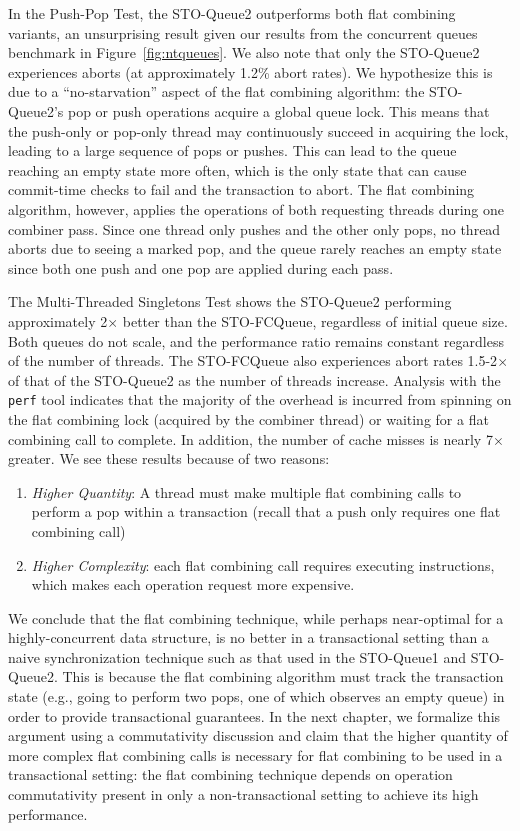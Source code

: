 In the Push-Pop Test, the STO-Queue2 outperforms both flat combining variants, an unsurprising result given our results from the concurrent queues benchmark in Figure~\ref{fig:ntqueues}. We also note that only the STO-Queue2 experiences aborts (at approximately 1.2\% abort rates). We hypothesize this is due to a ``no-starvation'' aspect of the flat combining algorithm: the STO-Queue2's pop or push operations acquire a global queue lock. This means that the push-only or pop-only thread may continuously succeed in acquiring the lock, leading to a large sequence of pops or pushes. This can lead to the queue reaching an empty state more often, which is the only state that can cause commit-time checks to fail and the transaction to abort. The flat combining algorithm, however, applies the operations of both requesting threads during one combiner pass. Since one thread only pushes and the other only pops, no thread aborts due to seeing a marked pop, and the queue rarely reaches an empty state since both one push and one pop are applied during each pass.

The Multi-Threaded Singletons Test shows the STO-Queue2 performing approximately 2$\times$ better than the STO-FCQueue, regardless of initial queue size. Both queues do not scale, and the performance ratio remains constant regardless of the number of threads. The STO-FCQueue also experiences abort rates 1.5-2$\times$ of that of the STO-Queue2 as the number of threads increase.
Analysis with the \texttt{perf} tool indicates that the majority of the overhead is incurred from spinning on the flat combining lock (acquired by the combiner thread) or waiting for a flat combining call to complete. In addition, the number of cache misses is nearly 7$\times$ greater. We see these results because of two reasons:
\begin{enumerate}
\item \emph{Higher Quantity}: A thread must make multiple flat combining calls to perform a pop within a transaction (recall that a push only requires one flat combining call) 
\item \emph{Higher Complexity}: each flat combining call requires executing instructions, which makes each operation request more expensive.
\end{enumerate}

We conclude that the flat combining technique, while perhaps near-optimal for a highly-concurrent data structure, is no better in a transactional setting than a naive synchronization technique such as that used in the STO-Queue1 and STO-Queue2. This is because the flat combining algorithm must track the transaction state (e.g., going to perform two pops, one of which observes an empty queue) in order to provide transactional guarantees. In the next chapter, we formalize this argument using a commutativity discussion and claim that the higher quantity of more complex flat combining calls is necessary for flat combining to be used in a transactional setting: the flat combining technique depends on operation commutativity present in only a non-transactional setting to achieve its high performance. 

